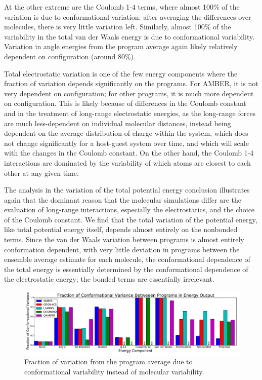 At the other extreme are the Coulomb 1-4 terms, where almost 100\% of
the variation is due to conformational variation: after averaging the
differences over molecules, there is very little variation left.
Similarly, almost 100\% of the variability in the total van der Waals
energy is due to conformational variability.  Variation in angle
energies from the program average again likely relatively dependent on
configuration (around 80\%).

Total electrostatic variation is one of the few energy components
where the fraction of variation depends significantly on the programs.
For AMBER, it is not very dependent on configuration; for other
programs, it is much more dependent on configuration. This is likely
because of differences in the Coulomb constant and in the treatment of
long-range electrostatic energies, as the long-range forces are much
less-dependent on individual molecular distances, instead being
dependent on the average distribution of charge within the system,
which does not change significantly for a host-guest system over time,
and which will scale with the changes in the Coulomb constant.  On the
other hand, the Coulomb 1-4 interactions are dominated by the
variability of which atoms are closest to each other at any given
time.

The analysis in the variation of the total potential energy conclusion
illustrates again that the dominant reason that the molecular
simulations differ are the evaluation of long-range interactions,
especially the electrostatics, and the choice of the Coulomb
constant. We find that the total variation of the potential energy,
like total potential energy itself, depends almost entirely on the
nonbonded terms.  Since the van der Waals variation between programs
is almost entirely conformation dependent, with very little deviation
in programs between the ensemble average estimate for each molecule,
the conformational dependence of the total energy is essentially
determined by the conformational dependence of the electrostatic
energy; the bonded terms are essentially irrelevant.


\begin{figure}[h]
\includegraphics[width=\textwidth]{fractionofvariation.pdf}   
\caption{Fraction of variation from the program average due to
  conformational variability instead of molecular variability.
\label{fig:confvariability}}
\end{figure}




